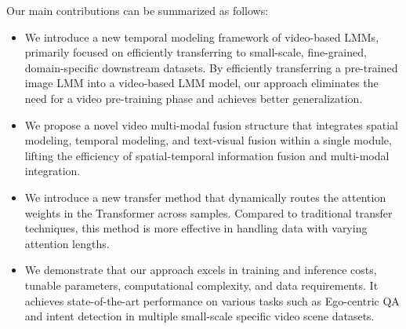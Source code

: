 Our main contributions can be summarized as follows:
\begin{itemize}
    \item We introduce a new temporal modeling framework of video-based LMMs, primarily focused on efficiently transferring to small-scale, fine-grained, domain-specific downstream datasets. By efficiently transferring a pre-trained image LMM into a video-based LMM model, our approach eliminates the need for a video pre-training phase and achieves better generalization.
    \item We propose a novel video multi-modal fusion structure that integrates spatial modeling, temporal modeling, and text-visual fusion within a single module, lifting the efficiency of spatial-temporal information fusion and multi-modal integration.
    \item We introduce a new transfer method that dynamically routes the attention weights in the Transformer across samples. Compared to traditional transfer techniques, this method is more effective in handling data with varying attention lengths.
    \item We demonstrate that our approach excels in training and inference costs, tunable parameters, computational complexity, and data requirements. It achieves state-of-the-art performance on various tasks such as Ego-centric QA and intent detection in multiple small-scale specific video scene datasets. 
\end{itemize}